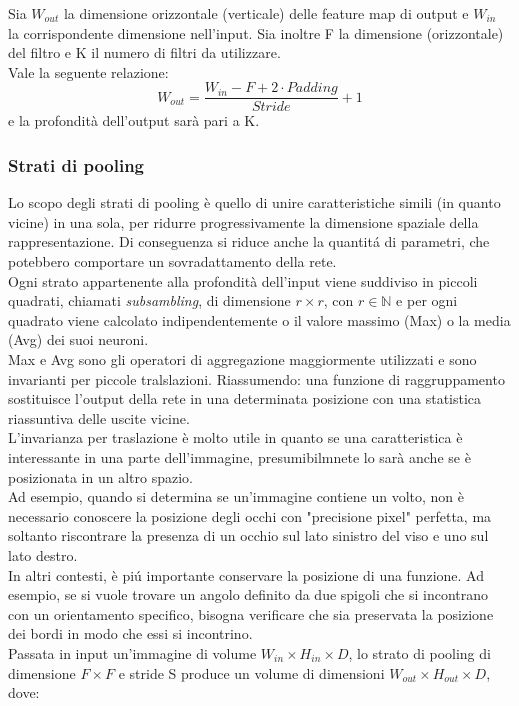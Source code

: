 \documentclass[a4paper,12pt,oneside]{book}
\begin{document}
Sia $W_{out}$ la dimensione orizzontale (verticale) delle feature map di output e $W_{in}$ la corrispondente dimensione nell'input. Sia inoltre F la dimensione (orizzontale) del filtro e K il numero di filtri da utilizzare.\\
Vale la seguente relazione:
\begin{equation}
W_{out}=\frac{W_{in} -F+2\cdot Padding}{Stride}+1
\end{equation}
e la profondit\`{a} dell'output sar\`{a} pari a K.
\newpage
\subsubsection{Strati di pooling}
Lo scopo degli strati di pooling \`e quello di unire caratteristiche simili (in quanto vicine) in una sola, per ridurre progressivamente la dimensione spaziale della rappresentazione. Di conseguenza si riduce anche la quantit\'{a} di parametri, che potebbero comportare un sovradattamento della rete.\\
Ogni strato appartenente alla profondit\`{a} dell'input viene suddiviso in piccoli quadrati, chiamati \textit{subsambling}, di dimensione  $r \times r$, con $r\in \mathbb{N}$ e  per ogni quadrato viene calcolato indipendentemente o il valore massimo (Max) o  la media (Avg) dei suoi neuroni.\\
Max e Avg sono gli operatori di aggregazione maggiormente utilizzati e sono invarianti per piccole tralslazioni. Riassumendo: una funzione di raggruppamento sostituisce l'output della rete in una determinata posizione con una statistica riassuntiva delle uscite vicine.\\
L'invarianza per traslazione \`e molto utile in quanto se una caratteristica \`e interessante in una parte dell'immagine, presumibilmnete lo sar\`{a} anche se \`e posizionata in un altro spazio.\\
Ad esempio, quando si determina se un'immagine contiene un volto, non \`e necessario conoscere la posizione degli occhi con "precisione pixel" perfetta, ma soltanto riscontrare la presenza di un occhio sul lato sinistro del viso e uno sul lato destro.\\
In altri contesti, \`e pi\'{u} importante conservare la posizione di una funzione. Ad esempio, se si vuole trovare un angolo definito da due spigoli che si incontrano con un orientamento specifico, bisogna verificare che sia preservata la posizione dei bordi in modo che essi si incontrino.\\
Passata in input un'immagine di volume $W_{in} \times H_{in} \times D$, lo strato di pooling di dimensione $F\times F$ e stride S produce un volume di dimensioni $W_{out} \times H_{out} \times D$, dove:
\end{document}
